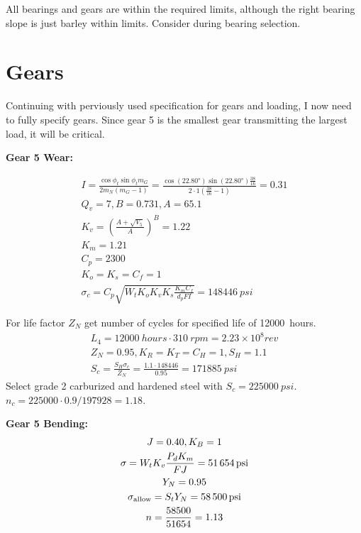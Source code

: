 \documentclass[titlepage]{article} %
\begin{document}
All bearings and gears are within the required limits, although the right
bearing slope is just barley within limits\cite{shigleydesign}. Consider during bearing selection.

\section{Gears}

Continuing with perviously used specification for gears and loading, I now need
to fully specify gears. Since gear 5 is the smallest gear transmitting the
largest load, it will be critical.

\textbf{Gear 5 Wear:}

\begin{gather*}
    I = \frac{\cos{\phi_t}\sin{\phi_t}m_G}{2m_N (m_G-1)} = \frac{\cos{(\ang{22.80})}\sin{(\ang{22.80})}\frac{38}{16}}{2\cdot1 (\frac{38}{16} - 1)} = 0.31\\
    Q_v = 7, B = 0.731, A = 65.1\\
    K_v = \left(\frac{A+\sqrt{V_5}}{A}\right)^B =  1.22\\
    K_m = 1.21\\
    C_p = 2300\\
    K_o = K_s = C_f = 1\\
    \sigma_c = C_p \sqrt{W_t K_o K_v K_s \frac{K_m C_f}{d_p F I}} = \SI{148446}{psi}
\end{gather*}

For life factor $Z_N$ get number of cycles for specified life of \SI{12000}{hours}.
\begin{gather*}
    L_4 = \SI{12000}{hours} \cdot \SI{310}{rpm} = 2.23 \times 10^8 \unit{rev}\\
    Z_N = 0.95, K_R = K_T = C_H = 1, S_H=1.1\\
    S_c = \frac{S_H \sigma_c}{Z_N} = \frac{1.1 \cdot 148446}{0.95} = \SI{171885}{psi}
\end{gather*}
Select grade 2 carburized and hardened steel with $S_c = \SI{225000}{psi}$. $n_c
= 225000 \cdot 0.9 / 197928 = 1.18$.

\textbf{Gear 5 Bending:}
\begin{gather*}
    J=0.40, K_B = 1\\
    \sigma = W_t K_v \frac{P_d K_m}{F J} = \SI{51654}{psi}\\
    Y_N = 0.95\\
    \sigma_{\textup{allow}} = S_t Y_N = \SI{58500}{psi}\\
    n=\frac{58500}{51654} = 1.13
\end{gather*}
\end{document}
